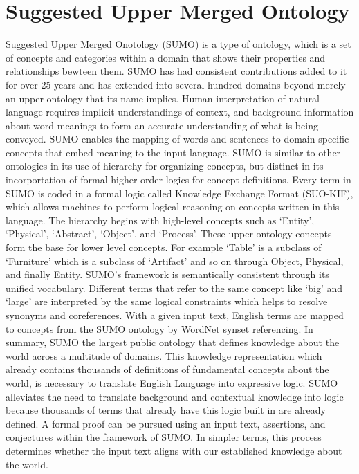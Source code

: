 \section{Suggested Upper Merged Ontology}
Suggested Upper Merged Onotology (SUMO) is a type of ontology, which is a set of concepts and categories within a domain that shows their properties and relationships bewteen them. SUMO has had consistent contributions added to it for over 25 years and has extended into several hundred domains beyond merely an upper ontology that its name implies. Human interpretation of natural language requires implicit understandings of context, and background information about word meanings to form an accurate understanding of what is being conveyed. SUMO enables the mapping of words and sentences to domain-specific concepts that embed meaning to the input language. SUMO is similar to other ontologies in its use of hierarchy for organizing concepts, but distinct in its incorportation of formal higher-order logics for concept definitions. Every term in SUMO is coded in a formal logic called Knowledge Exchange Format (SUO-KIF), which allows machines to perform logical reasoning on concepts written in this language. The hierarchy begins with high-level concepts such as `Entity', `Physical', `Abstract', `Object', and `Process'. These upper ontology concepts form the base for lower level concepts. For example `Table' is a subclass of `Furniture' which is a subclass of `Artifact' and so on through Object, Physical, and finally Entity. SUMO's framework is semantically consistent through its unified vocabulary. Different terms that refer to the same concept like `big' and `large' are interpreted by the same logical constraints which helps to resolve synonyms and coreferences. With a given input text, English terms are mapped to concepts from the SUMO ontology by WordNet synset referencing.
In summary, SUMO the largest public ontology that defines knowledge about the world across a multitude of domains. This knowledge representation which already contains thousands of definitions of fundamental concepts about the world, is necessary to translate English Language into expressive logic. SUMO alleviates the need to translate background and contextual knowledge into logic because thousands of terms that already have this logic built in are already defined. A formal proof can be pursued using an input text, assertions, and conjectures within the framework of SUMO. In simpler terms, this process determines whether the input text aligns with our established knowledge about the world.

